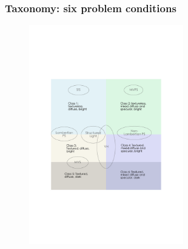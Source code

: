 \documentclass{beamer}
\begin{document}
\begin{frame}
\frametitle{Taxonomy: six problem conditions}

\begin{figure}[h]
\includegraphics[width=0.6\textwidth]{taxo/six_class}
\end{figure}

\end{frame}

\end{document}
